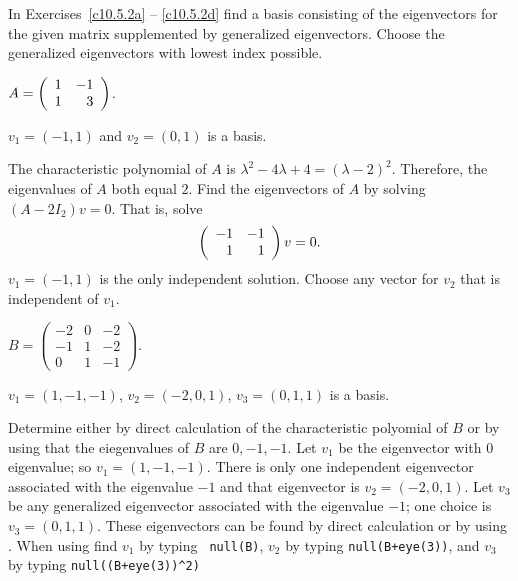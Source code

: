 \documentclass{ximera}
\begin{document}
\noindent In Exercises~\ref{c10.5.2a} -- \ref{c10.5.2d} find a basis 
consisting of the eigenvectors for the given matrix supplemented by 
generalized eigenvectors.  Choose the generalized eigenvectors with 
lowest index possible.
\begin{exercise}  \label{c10.5.2a}
$A=\left(\begin{array}{rr} 1 & -1\\ 1 &3\end{array}\right)$.

\begin{solution}
\ans $v_1=(-1,1)$ and $v_2 = (0,1)$ is a basis.

\soln  The characteristic polynomial of $A$ is $\lambda^2-4\lambda+4=(\lambda-2)^2$.
Therefore, the eigenvalues of $A$ both equal $2$.  Find the eigenvectors of $A$ by 
solving $(A-2I_2)v=0$.  That is, solve
\[
\left(\begin{array}{rr} -1 & -1\\ 1 &1\end{array}\right)v = 0.
\]
$v_1=(-1,1)$ is the only independent solution.  Choose any vector for $v_2$ that is
independent of $v_1$.

\end{solution}
\end{exercise}
\begin{exercise} \label{c10.5.2b}
$B=\left(\begin{array}{rrr} -2 & 0 & -2 \\-1 & 1 & -2 \\ 0 & 1 & -1 \end{array}
\right)$.

\begin{solution}
\ans $v_1=(1,-1,-1)$, $v_2=(-2,0,1)$, $v_3=(0,1,1)$ is a basis.

\soln  Determine either by direct calculation of the characteristic polyomial of $B$ 
or by using \Matlab that the eiegenvalues of $B$ are $0,-1,-1$.  Let $v_1$ be the
eigenvector with $0$ eigenvalue; so $v_1=(1,-1,-1)$.  There is only one independent 
eigenvector associated with the eigenvalue $-1$ and that eigenvector is
$v_2=(-2,0,1)$.  Let $v_3$ be any generalized eigenvector associated with the
eigenvalue $-1$; one choice is $v_3=(0,1,1)$.  These eigenvectors can be found by
direct calculation or by using \Matlab.  When using \Matlab find $v_1$ by typing {\tt
null(B)}, $v_2$ by typing {\tt null(B+eye(3))}, and $v_3$ by typing 
{\tt null((B+eye(3))\^{}2)}

\end{solution}
\end{exercise}
\end{document}
